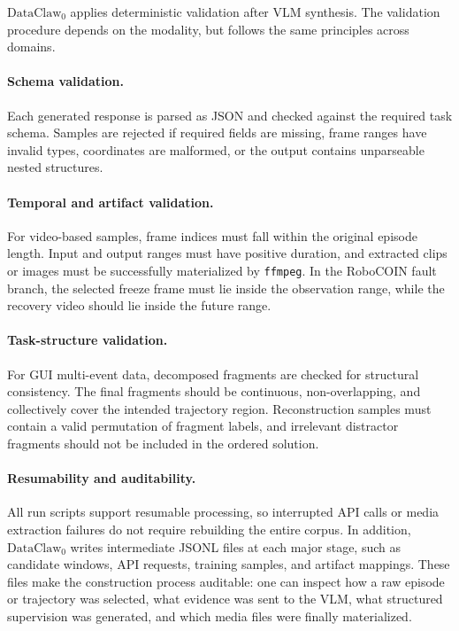 \documentclass{llmxive}
\begin{document}
$\text{DataClaw}_0$ applies deterministic validation after VLM synthesis. The validation procedure depends on the modality, but follows the same principles across domains.

\paragraph{Schema validation.}
Each generated response is parsed as JSON and checked against the required task schema. Samples are rejected if required fields are missing, frame ranges have invalid types, coordinates are malformed, or the output contains unparseable nested structures.

\paragraph{Temporal and artifact validation.}
For video-based samples, frame indices must fall within the original episode length. Input and output ranges must have positive duration, and extracted clips or images must be successfully materialized by \texttt{ffmpeg}. In the RoboCOIN fault branch, the selected freeze frame must lie inside the observation range, while the recovery video should lie inside the future range.

\paragraph{Task-structure validation.}
For GUI multi-event data, decomposed fragments are checked for structural consistency. The final fragments should be continuous, non-overlapping, and collectively cover the intended trajectory region. Reconstruction samples must contain a valid permutation of fragment labels, and irrelevant distractor fragments should not be included in the ordered solution.

\paragraph{Resumability and auditability.}
All run scripts support resumable processing, so interrupted API calls or media extraction failures do not require rebuilding the entire corpus. In addition, $\text{DataClaw}_0$ writes intermediate JSONL files at each major stage, such as candidate windows, API requests, training samples, and artifact mappings. These files make the construction process auditable: one can inspect how a raw episode or trajectory was selected, what evidence was sent to the VLM, what structured supervision was generated, and which media files were finally materialized.
\end{document}
